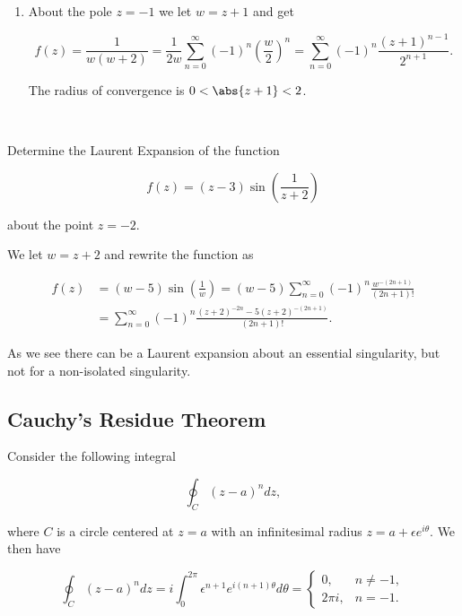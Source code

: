 \documentclass[english,a4paper,12pt]{report}
\begin{document}
{\begin{enumerate}
    \item About the pole \(z = -1\) we let \(w = z+1\) and get 
    
    \begin{equation}
        f(z) = \frac{1}{w(w+2)} = \frac{1}{2w} \sum_{n=0}^{\infty} (-1)^{n} \left(\frac{w}{2} \right)^{n} = \sum_{n=0}^{\infty} (-1)^{n} \frac{(z+1)^{n-1} }{2^{n+1} }.      
    \end{equation}

    The radius of convergence is \(0 < \abs{z+1} <2 \). 
\end{enumerate}
~
} 

{Determine the Laurent Expansion of the function 

\begin{equation}
    f(z) = (z-3) \sin \left( \frac{1}{z+2}  \right)
\end{equation}

about the point \(z=-2\).
}
{We let \(w = z+2\) and rewrite the function as 

\begin{equation}
    \begin{aligned} 
    f(z) &=  (w-5) \sin \left( \frac{1}{w}  \right) = (w-5)  \sum_{n=0}^{\infty} (-1)^{n} \frac{w^{-(2n+1)}}{(2n+1)!}\\
    & = \sum_{n=0}^{\infty} (-1)^{n} \frac{(z+2)^{-2n} - 5(z+2)^{-(2n+1)}  }{(2n+1)!}.      
    \end{aligned} 
\end{equation}

As we see there can be a Laurent expansion about an essential singularity, but not for a non-isolated singularity.
~
} 




\subsection{Cauchy's Residue Theorem}

Consider the following integral

\begin{equation}
    \oint_{C} (z-a)^{n} dz, 
\end{equation}

where \(C\) is a circle centered at \(z = a\) with an infinitesimal radius \(z = a+\epsilon e^{i \theta } \). We then have

\begin{equation}
    \oint_{C} (z-a)^{n} dz = i \int_{0}^{2\pi } \epsilon ^{n+1} e^{i(n+1)\theta } d \theta = \begin{cases}
        0,& n \neq -1,\\
        2\pi i,& n = -1.
    \end{cases}
\end{equation}
\end{document}
